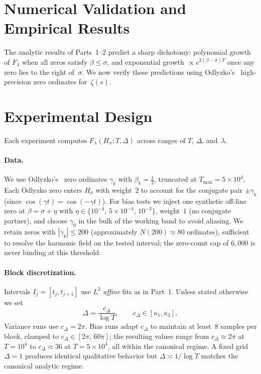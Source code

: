 
\section{Numerical Validation and Empirical Results}

The analytic results of Parts~1–2 predict a sharp dichotomy:
polynomial growth of $F_\lambda$ when all zeros satisfy $\beta\le\sigma$,
and exponential growth $\propto e^{2(\beta-\sigma)T}$ once any zero lies
to the right of~$\sigma$.  We now verify these predictions using
Odlyzko’s~\cite{odlyzko} high-precision zero ordinates
for~$\zeta(s)$.

\section{Experimental Design}

Each experiment computes $F_\lambda(H_\sigma;T,\Delta)$
across ranges of $T$, $\Delta$, and~$\lambda$.

\paragraph{Data.}
We use Odlyzko’s~\cite{odlyzko} zero ordinates $\gamma_k$ with $\beta_k=\tfrac12$,
truncated at $T_{\max}=5\times10^4$.
Each Odlyzko zero enters $H_\sigma$ with weight~$2$ to account
for the conjugate pair $\pm\gamma_k$ (since $\cos(\gamma t)=\cos(-\gamma t)$).
For bias tests we inject one synthetic off-line zero at
$\beta=\sigma+\eta$ with $\eta\in\{10^{-4},\,5\times10^{-4},\,10^{-3}\}$,
weight~$1$ (no conjugate partner),
and choose $\gamma_0$ in the bulk of the working band to avoid aliasing.
We retain zeros with $|\gamma_k| \le 200$ (approximately $N(200) \approx 80$
ordinates), sufficient to resolve the harmonic field on the tested interval;
the zero-count cap of $6{,}000$ is never binding at this threshold.

\paragraph{Block discretization.}
Intervals $I_j=[t_j,t_{j+1}]$ use $L^2$ \emph{affine} fits as in Part~1.
Unless stated otherwise we set
\[
\Delta=\frac{c_\Delta}{\log T},\qquad c_\Delta\in[\kappa_1,\kappa_2],
\]
Variance runs use $c_\Delta=2\pi$.
Bias runs adapt $c_\Delta$ to maintain at least~$8$ samples per block,
clamped to $c_\Delta\in[2\pi,\,60\pi]$; the resulting values range from
$c_\Delta\approx 2\pi$ at $T=10^4$ to $c_\Delta\approx 36$ at $T=5\times10^4$,
all within the canonical regime.
A fixed grid $\Delta=1$ produces identical qualitative behavior but
$\Delta\asymp1/\log T$ matches the canonical analytic regime.

